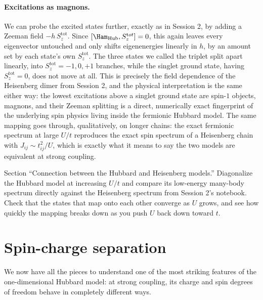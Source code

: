 \documentclass[all_sessions.tex]{subfiles}
\begin{document}
\paragraph{Excitations as magnons.} We can probe the excited states further, exactly as in Session
2, by adding a Zeeman field $-h\,S_z^{\mathrm{tot}}$. Since $[\Ham_{\mathrm{Hub}}, S_z^{\mathrm
tot}]=0$, this again leaves every eigenvector untouched and only shifts eigenenergies linearly in
$h$, by an amount set by each state's own $S_z^{\mathrm{tot}}$. The three states we called the
triplet split apart linearly, into $S_z^{\mathrm{tot}} = -1, 0, +1$ branches, while the singlet
ground state, having $S_z^{\mathrm{tot}}=0$, does not move at all. This is precisely the field
dependence of the Heisenberg dimer from Session 2, and the physical interpretation is the same
either way: the lowest excitations above a singlet ground state are spin-$1$ objects, magnons, and
their Zeeman splitting is a direct, numerically exact fingerprint of the underlying spin physics
living inside the fermionic Hubbard model. The same mapping goes through, qualitatively, on longer
chains: the exact fermionic spectrum at large $U/t$ reproduces the exact spin spectrum of a
Heisenberg chain with $J_{ij}\sim t_{ij}^2/U$, which is exactly what it means to say the two models
are equivalent at strong coupling.

\begin{notebook}
Section ``Connection between the Hubbard and Heisenberg models.'' Diagonalize the Hubbard model at
increasing $U/t$ and compare its low-energy many-body spectrum directly against the Heisenberg
spectrum from Session 2's notebook. Check that the states that map onto each other converge as $U$
grows, and see how quickly the mapping breaks down as you push $U$ back down toward $t$.
\end{notebook}

\section{Spin-charge separation}
\label{sec:spincharge}
We now have all the pieces to understand one of the most striking features of the one-dimensional
Hubbard model: at strong coupling, its charge and spin degrees of freedom behave in completely
different ways.
\end{document}
